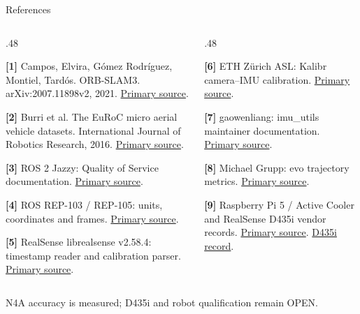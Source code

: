 \documentclass[aspectratio=169,12pt,t]{beamer}
\begin{document}
\begin{frame}{References}\hypertarget{referencepage}{}\footnotesize\begin{columns}[T,onlytextwidth]
\begin{column}{.48\textwidth}
\par\medskip\textbf{[1]} Campos, Elvira, Gómez Rodríguez, Montiel, Tardós. ORB-SLAM3. arXiv:2007.11898v2, 2021. \href{https://arxiv.org/abs/2007.11898}{Primary source}.
\par\medskip\textbf{[2]} Burri et al. The EuRoC micro aerial vehicle datasets. International Journal of Robotics Research, 2016. \href{https://projects.asl.ethz.ch/datasets/euroc-mav/}{Primary source}.
\par\medskip\textbf{[3]} ROS 2 Jazzy: Quality of Service documentation. \href{https://docs.ros.org/en/jazzy/Concepts/Intermediate/About-Quality-of-Service-Settings.html}{Primary source}.
\par\medskip\textbf{[4]} ROS REP-103 / REP-105: units, coordinates and frames. \href{https://www.ros.org/reps/rep-0105.html}{Primary source}.
\par\medskip\textbf{[5]} RealSense librealsense v2.58.4: timestamp reader and calibration parser. \href{https://github.com/realsenseai/librealsense/tree/v2.58.4}{Primary source}.
\end{column}
\begin{column}{.48\textwidth}
\par\medskip\textbf{[6]} ETH Zürich ASL: Kalibr camera–IMU calibration. \href{https://github.com/ethz-asl/kalibr/wiki/camera-imu-calibration}{Primary source}.
\par\medskip\textbf{[7]} gaowenliang: imu\_utils maintainer documentation. \href{https://github.com/gaowenliang/imu_utils}{Primary source}.
\par\medskip\textbf{[8]} Michael Grupp: evo trajectory metrics. \href{https://github.com/MichaelGrupp/evo/wiki/Metrics}{Primary source}.
\par\medskip\textbf{[9]} Raspberry Pi 5 / Active Cooler and RealSense D435i vendor records. \href{https://www.raspberrypi.com/products/raspberry-pi-5/}{Primary source}. \href{https://www.intel.com/content/www/us/en/products/sku/190004/intel-realsense-depth-camera-d435i/specifications.html}{D435i record}.
\end{column}
\end{columns}\vfill\normalsize N4A accuracy is measured; D435i and robot qualification remain OPEN.\end{frame}
\appendix
\end{document}
